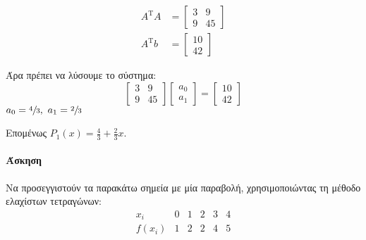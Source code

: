 \documentclass[11pt,a4paper,notitlepage,fleqn]{article}
\begin{document}
    \begin{align*}
    	A^{\mathrm T} A &= \left[\begin{matrix}
    	3 & 9 \\ 9 & 45
    	\end{matrix} \right] \\
    	A^{\mathrm T} b &= \left[ \begin{matrix}
    	10 \\ 42
    	\end{matrix} \right]
    \end{align*}
    
    Άρα πρέπει να λύσουμε το σύστημα:
    \[
    \left[\begin{matrix}
    3 & 9 \\ 9 & 45
    \end{matrix}\right] \left[\begin{matrix}
    a_0 \\ a_1
    \end{matrix}\right] = \left[\begin{matrix}
    10 \\ 42
    \end{matrix}\right]
    \]
    \( a_0 = \sfrac{4}{3},\ a_1 = \sfrac{2}{3}  \)
    
    Επομένως \( \displaystyle P_1(x) = \frac{4}{3} + \frac{2}{3}x \).
    
    \paragraph{Άσκηση}
    Να προσεγγιστούν τα παρακάτω σημεία με μία παραβολή, χρησιμοποιώντας
    τη μέθοδο ελαχίστων τετραγώνων:
    \[
    \begin{array}{r|ccccc}
    x_i & 0 & 1 & 2 & 3 & 4 \\ \hline
    f(x_i) & 1 & 2 & 2 & 4 & 5
    \end{array}
    \]
\end{document}
